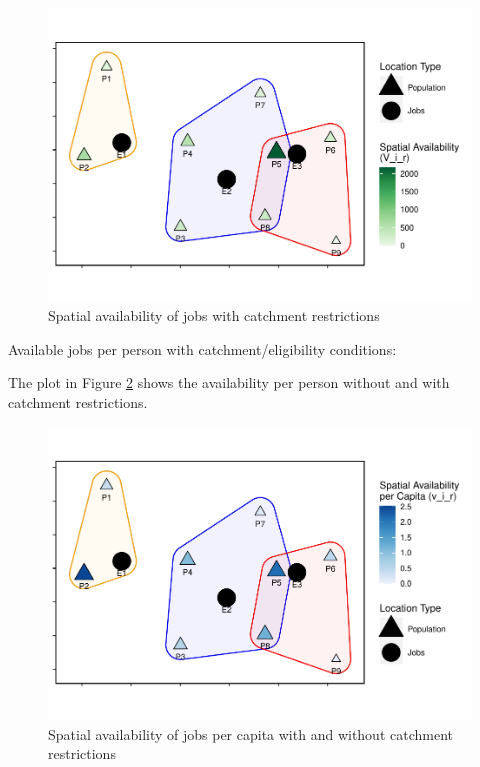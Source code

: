 \documentclass[]{elsarticle} %
\begin{document}
\begin{figure}
\includegraphics[width=1\linewidth]{Spatial-Availability_files/figure-latex/toy-example-availability-with-catchments-1} \caption{\label{fig:toy-example-availability-with-catchments}Spatial availability of jobs with catchment restrictions}\label{fig:toy-example-availability-with-catchments}
\end{figure}

Available jobs per person with catchment/eligibility conditions:

The plot in Figure
\ref{fig:toy-example-availability-with-catchments-per-capita} shows the
availability per person without and with catchment restrictions.

\begin{figure}
\includegraphics[width=1\linewidth]{Spatial-Availability_files/figure-latex/toy-example-availability-with-catchments-per-capita-1} \caption{\label{fig:toy-example-availability-with-catchments-per-capita}Spatial availability of jobs per capita with and without catchment restrictions }\label{fig:toy-example-availability-with-catchments-per-capita}
\end{figure}
\end{document}
